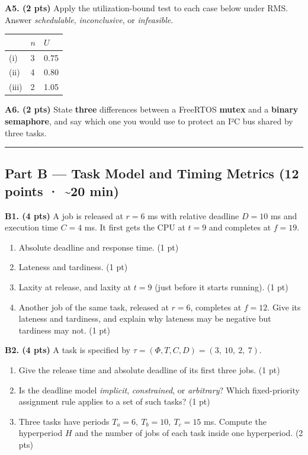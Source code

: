 \documentclass[
  11pt,
]{article}
\newcounter{none} %
\providecommand{\tightlist}{%
  \setlength{\itemsep}{0pt}\setlength{\parskip}{0pt}}
\begin{document}
\textbf{A5. (2 pts)} Apply the utilization-bound test to each case below
under RMS. Answer \emph{schedulable}, \emph{inconclusive}, or
\emph{infeasible}.

{\def\LTcaptype{none} %
\begin{longtable}[]{@{}lll@{}}
\toprule\noalign{}
& \(n\) & \(U\) \\
\midrule\noalign{}
\endhead
\bottomrule\noalign{}
\endlastfoot
(i) & 3 & 0.75 \\
(ii) & 4 & 0.80 \\
(iii) & 2 & 1.05 \\
\end{longtable}
}

\textbf{A6. (2 pts)} State \textbf{three} differences between a FreeRTOS
\textbf{mutex} and a \textbf{binary semaphore}, and say which one you
would use to protect an I²C bus shared by three tasks.

\begin{center}\rule{0.5\linewidth}{0.5pt}\end{center}

\subsection{Part B --- Task Model and Timing Metrics (12 points ·
\textasciitilde20
min)}\label{part-b-task-model-and-timing-metrics-12-points-20-min}

\textbf{B1. (4 pts)} A job is released at \(r = 6\) ms with relative
deadline \(D = 10\) ms and execution time \(C = 4\) ms. It first gets
the CPU at \(t = 9\) and completes at \(f = 19\).

\begin{enumerate}
\def\labelenumi{\alph{enumi}.}
\tightlist
\item
  Absolute deadline and response time. (1 pt)
\item
  Lateness and tardiness. (1 pt)
\item
  Laxity at release, and laxity at \(t = 9\) (just before it starts
  running). (1 pt)
\item
  Another job of the same task, released at \(r = 6\), completes at
  \(f = 12\). Give its lateness and tardiness, and explain why lateness
  may be negative but tardiness may not. (1 pt)
\end{enumerate}

\textbf{B2. (4 pts)} A task is specified by
\(\tau = (\Phi, T, C, D) = (3,\ 10,\ 2,\ 7)\).

\begin{enumerate}
\def\labelenumi{\alph{enumi}.}
\tightlist
\item
  Give the release time and absolute deadline of its first three jobs.
  (1 pt)
\item
  Is the deadline model \emph{implicit}, \emph{constrained}, or
  \emph{arbitrary}? Which fixed-priority assignment rule applies to a
  set of such tasks? (1 pt)
\item
  Three tasks have periods \(T_a = 6,\ T_b = 10,\ T_c = 15\) ms. Compute
  the hyperperiod \(H\) and the number of jobs of each task inside one
  hyperperiod. (2 pts)
\end{enumerate}
\end{document}
